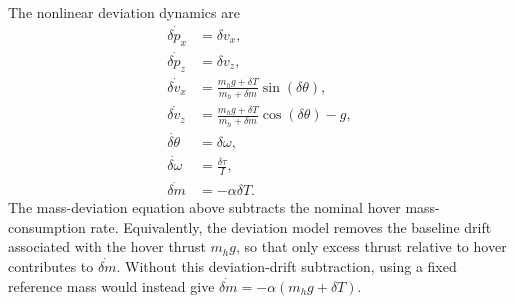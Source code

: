The nonlinear deviation dynamics are
\begin{align}
    \dot{\delta p_x}
    &=
    \delta v_x, \\
    \dot{\delta p_z}
    &=
    \delta v_z, \\
    \dot{\delta v_x}
    &=
    \frac{m_h g+\delta T}{m_h+\delta m}\sin(\delta\theta), \\
    \dot{\delta v_z}
    &=
    \frac{m_h g+\delta T}{m_h+\delta m}\cos(\delta\theta)-g, \\
    \dot{\delta\theta}
    &=
    \delta\omega, \\
    \dot{\delta\omega}
    &=
    \frac{\delta\tau}{I}, \\
    \dot{\delta m}
    &=
    -\alpha\delta T.
\end{align}
The mass-deviation equation above subtracts the nominal hover mass-consumption rate. Equivalently, the deviation model removes the baseline drift associated with the hover thrust \(m_hg\), so that only excess thrust relative to hover contributes to \(\dot{\delta m}\). Without this deviation-drift subtraction, using a fixed reference mass would instead give \(\dot{\delta m} = -\alpha(m_h g+\delta T)\).

